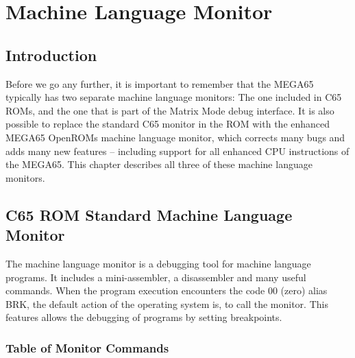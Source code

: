 \chapter{Machine Language Monitor}

\section{Introduction}

Before we go any further, it is important to remember that the MEGA65 typically
has two separate machine language monitors:  The one included in C65 ROMs, and
the one that is part of the Matrix Mode debug interface.  It is also possible to
replace the standard C65 monitor in the ROM with the enhanced MEGA65 OpenROMs
machine language monitor, which corrects many bugs and adds many new features --
including support for all enhanced CPU instructions of the MEGA65.  This chapter
describes all three of these machine language monitors.

\section{C65 ROM Standard Machine Language Monitor}

The machine language monitor is a debugging tool for machine language
programs. It includes a mini-assembler, a disassembler and many useful commands.
When the program execution encounters the code 00 (zero) alias BRK,
the default action of the operating system is, to call the monitor.
This features allows the debugging of programs by setting breakpoints.

\subsection{Table of Monitor Commands}

